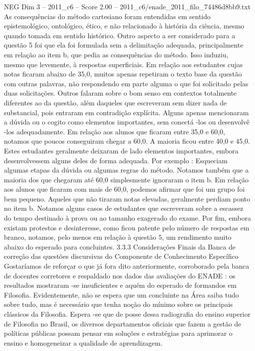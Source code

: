 \begin{textsample}{NEG Dim 3 – 2011\_c6 – Score 2.00 – 2011\_c6/enade\_2011\_filo\_74486d8bb9.txt}
As consequências do método cartesiano foram entendidas em sentido epistemológico, ontológico, ético, e não relacionado à história da ciência, mesmo quando tomada em sentido histórico.
Outro aspecto a ser considerado para a questão 5 foi que ela foi formulada sem a delimitação adequada, principalmente em relação ao item b, que pedia as consequências do método.
Isso induziu, mesmo que levemente, à respostas superficiais.
Em relação aos estudantes cujas notas ficaram abaixo de 35,0, muitos apenas repetiram o texto base da questão com outras palavras, não respondendo em parte alguma o que foi solicitado pelas duas solicitações.
Outros falaram sobre o bom senso em contextos totalmente diferentes ao da questão, além daqueles que escreveram sem dizer nada de substancial, pois entraram em contradição explícita.
Alguns apenas mencionaram a dúvida ou o cogito como elementos importantes, sem conectá -los ou desenvolvê -los adequadamente.
Em relação aos alunos que ficaram entre 35,0 e 60,0, notamos que poucos conseguiram chegar a 60,0.
A maioria ficou entre 40,0 e 45,0.
Estes estudantes geralmente deixaram de lado elementos importantes, embora desenvolvessem alguns deles de forma adequada.
Por exemplo : Esqueciam algumas etapas da dúvida ou algumas regras do método.
Notamos também que a maioria dos que chegaram até 60,0 simplesmente ignoraram o item b.
Em relação aos alunos que ficaram com mais de 60,0, podemos afirmar que foi um grupo foi bem pequeno.
Aqueles que não tiraram notas elevadas, geralmente perdiam ponto no item b.
Notamos alguns casos de estudantes que escreveram sobre a escassez do tempo destinado à prova ou ao tamanho exagerado do exame.
Por fim, embora existam protestos e desinteresse, como ficou patente pelo número de respostas em branco, notamos, pelo menos em relação à questão 5, um rendimento muito abaixo do esperado para concluintes. 3.3.3 Considerações Finais da Banca de correção das questões discursivas do Componente de Conhecimento Específico Gostaríamos de reforçar o que já fora dito anteriormente, corroborado pela banca de docentes corretores e respaldado nos dados das avaliações do ENADE : os resultados mostraram -se insuficientes e aquém do esperado de formandos em Filosofia.
Evidentemente, não se espera que um concluinte na Área saiba tudo sobre tudo, mas é necessário que tenha noção do mínimo sobre os principais clássicos da Filosofia.
Espera -se que de posse dessa radiografia do ensino superior de Filosofia no Brasil, os diversos departamentos oficiais que fazem a gestão de políticas públicas possam pensar em soluções e estratégias para aprimorar o ensino e homogeneizar a qualidade de aprendizagem.

\end{textsample}
